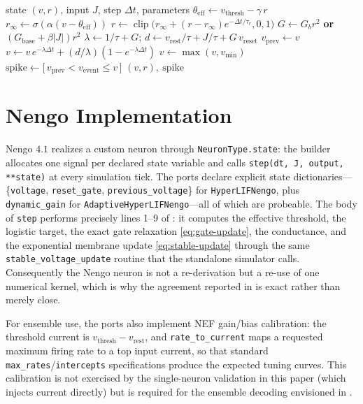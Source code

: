 \documentclass[journal]{IEEEtran}
\newcommand{\vth}{v_{\mathrm{thresh}}}
\newcommand{\vr}{v_{\mathrm{rest}}}
\newcommand{\vre}{v_{\mathrm{reset}}}
\newcommand{\vmin}{v_{\min}}
\newcommand{\teff}{\theta_{\mathrm{eff}}}
\newcommand{\rinf}{r_{\infty}}
\newcommand{\Gb}{G_{b}}
\newcommand{\Gbase}{G_{\mathrm{base}}}
\newcommand{\code}[1]{\texttt{#1}}
\begin{document}
\begin{algorithm}[t]
\caption{HyperLIF / Adaptive HyperLIF discrete update (one step).}
\label{alg:step}
\begin{algorithmic}[1]
\Require state $(v,r)$, input $J$, step $\Delta t$, parameters
\State $\teff \gets \vth - \gamma\,r$ 
\State $\rinf \gets \sigma(\alpha(v-\teff))$ 
\State $r \gets \operatorname{clip}\!\big(\rinf + (r-\rinf)e^{-\Delta t/\tau_r},0,1\big)$
\State $G \gets \Gb r^2$ \textbf{ or } $(\Gbase+\beta|J|)r^2$ 
\State $\lambda \gets 1/\tau + G$;\;\; $d \gets \vr/\tau + J/\tau + G\,\vre$
\State $v_{\mathrm{prev}} \gets v$
\State $v \gets v\,e^{-\lambda\Delta t} + (d/\lambda)(1-e^{-\lambda\Delta t})$
\State $v \gets \max(v, \vmin)$
\State $\mathrm{spike} \gets \big[\,v_{\mathrm{prev}} < v_{\mathrm{event}} \le v\,\big]$
\State \Return $(v,r),\ \mathrm{spike}$
\end{algorithmic}
\end{algorithm}

\section{Nengo Implementation}\label{sec:nengo}
Nengo $4.1$ realizes a custom neuron through \code{NeuronType.state}: the builder
allocates one signal per declared state variable and calls
\code{step(dt, J, output, **state)} at every simulation tick. The ports declare
explicit state dictionaries---\{\code{voltage}, \code{reset\_gate},
\code{previous\_voltage}\} for \code{HyperLIFNengo}, plus \code{dynamic\_gain}
for \code{AdaptiveHyperLIFNengo}---all of which are probeable. The body of
\code{step} performs precisely lines 1--9 of : it computes the
effective threshold, the logistic target, the exact gate relaxation
\cref{eq:gate-update}, the conductance, and the exponential membrane update
\cref{eq:stable-update} through the same \code{stable\_voltage\_update} routine
that the standalone simulator calls. Consequently the Nengo neuron is not a
re-derivation but a re-use of one numerical kernel, which is why the agreement
reported in  is exact rather than merely close.

For ensemble use, the ports also implement NEF gain/bias calibration: the
threshold current is $\vth-\vr$, and \code{rate\_to\_current} maps a requested
maximum firing rate to a top input current, so that standard
\code{max\_rates}/\code{intercepts} specifications produce the expected tuning
curves. This calibration is not exercised by the single-neuron validation in
this paper (which injects current directly) but is required for the ensemble
decoding envisioned in .
\end{document}

